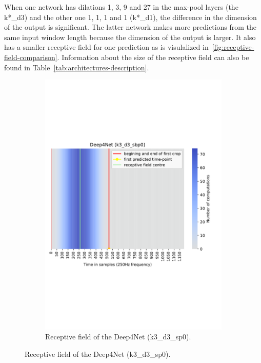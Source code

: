 When one network has dilations 1, 3, 9 and 27 in the max-pool layers (the k*\_d3) and the other one 1, 1, 1 and 1 (k*\_d1), the difference in the dimension of the output is significant.
The latter network makes more predictions from the same input window length because the dimension of the output is larger.
It also has a smaller receptive field for one prediction as is visulalized in~\cref{fig:receptive-field-comparison}.
Information about the size of the receptive field can also be found in Table~\ref{tab:architectures-description}.

\begin{figure}[!htpb]
\centering
\begin{subfigure}[b]{0.44\textwidth}
   \includegraphics[width=\linewidth]{img/ch3/deep4net-receptive-field}
   \caption{Receptive field of the Deep4Net (k3\_d3\_sp0).}
\end{subfigure}

\end{figure}
